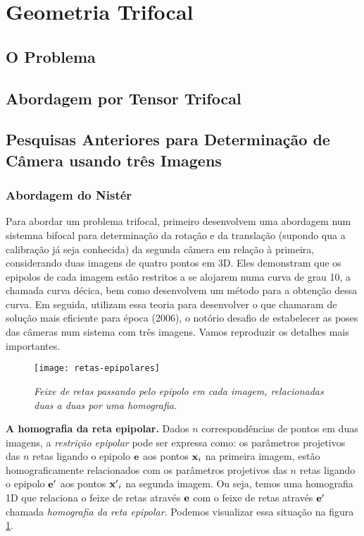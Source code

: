 \section{Geometria Trifocal}

\subsection{O Problema}

\subsection{Abordagem por Tensor Trifocal}

\subsection{Pesquisas Anteriores para Determinação de Câmera usando três Imagens}

\subsubsection{Abordagem do Nistér}

Para abordar um problema trifocal, primeiro \cite{2503343} desenvolvem uma abordagem num sistemna bifocal para determinação da rotação e da translação (supondo qua a calibração já seja conhecida) da segunda câmera em relação à primeira, considerando duas imagens de quatro pontos em 3D. Eles demonstram que os epipolos de cada imagem estão restritos a se alojarem numa curva de grau 10, a chamada curva décica, bem como desenvolvem um método para a obtenção dessa curva. Em seguida, utilizam essa teoria para desenvolver o que chamaram de solução mais eficiente para época (2006), o notório desafio de estabelecer as poses das câmeras num sistema com três imagens. Vamos reproduzir os detalhes mais importantes. 

\begin{figure}[!htb]
\centering
\texttt{[image: retas-epipolares]}
\caption{\textit{Feixe de retas passando pelo epipolo em cada imagem, relacionadas duas a duas por uma homografia.}}
\label{retas-epipolares}
\end{figure}

{\bf A homografia da reta epipolar.} Dados $n$ correspondências de pontos em duas imagens, a \textit{restrição epipolar} \citep{faugeras93three} pode ser expressa como: os parâmetros projetivos das $n$ retas ligando o epipolo ${\bf e}$ aos pontos ${\bf x}_i$ na primeira imagem, estão homograficamente relacionados com os parâmetros projetivos das $n$ retas ligando o epipolo ${\bf e'}$ aos pontos ${\bf x'}_i$ na segunda imagem. Ou seja, temos uma homografia 1D que relaciona o feixe de retas através ${\bf e}$ com o feixe de retas através ${\bf e'}$ chamada \textit{homografia da reta epipolar}. Podemos visualizar essa situação na figura \ref{retas-epipolares}.


